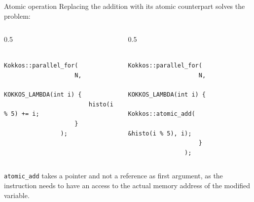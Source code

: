 \documentclass[
    aspectratio=169,
    \createHandout
]{beamer}
\begin{document}
\begin{frame}[fragile]{Atomic operation}
    Replacing the addition with its atomic counterpart solves the problem:
    \begin{columns}
        \begin{column}{0.5\linewidth}
            \begin{verbatim}
                Kokkos::parallel_for(
                    N,
                    KOKKOS_LAMBDA(int i) {
                        histo(i % 5) += i;
                    }
                );
            \end{verbatim}
        \end{column}
        \begin{column}{0.5\linewidth}
            \begin{verbatim}
                Kokkos::parallel_for(
                    N,
                    KOKKOS_LAMBDA(int i) {
                        Kokkos::atomic_add(
                            &histo(i % 5), i);
                    }
                );
            \end{verbatim}
        \end{column}
    \end{columns}
    \pause
     \texttt{atomic\_add} takes a pointer and not a
    reference as first argument, as the instruction needs to have an access to
    the actual memory address of the modified variable.
\end{frame}
\end{document}
